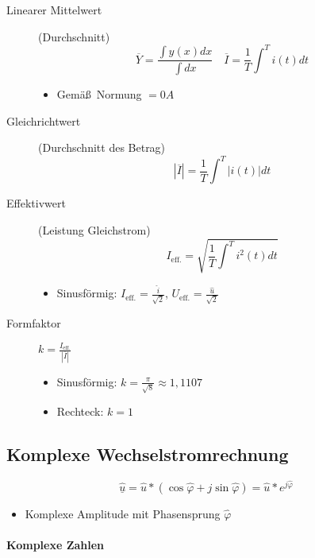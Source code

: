 \begin{description}
  \item[Linearer Mittelwert] (Durchschnitt)
    $$\overline{Y} = \frac{\int y(x)dx}{\int dx} \quad \overline{I} = \frac{1}{T} \int^T i(t) dt$$

    \begin{itemize}
      \item Gemä\ss~Normung $= 0A$
    \end{itemize}

  \item[Gleichrichtwert] (Durchschnitt des Betrag)
    $$|\overline{I}| = \frac{1}{T} \int^T |i(t)| dt$$

  \item[Effektivwert] (Leistung Gleichstrom)
    $$I_\text{eff.} = \sqrt{\frac{1}{T} \int^T i^2(t) dt} $$

    \begin{itemize}
      \item Sinusförmig: $I_\text{eff.} = \frac{\hat{i}}{\sqrt{2}}$, $U_\text{eff.} = \frac{\hat{u}}{\sqrt{2}}$
    \end{itemize}

  \item[Formfaktor] $k = \frac{I_\text{eff.}}{|\overline{I}|}$

    \begin{itemize}
      \item Sinusförmig: $k = \frac{\pi}{\sqrt{8}} \approx 1,1107$
      \item Rechteck: $k = 1$
    \end{itemize}
\end{description}

\subsection{Komplexe Wechselstromrechnung}

$$\underline{\hat{u}} = \hat{u} * (\cos \hat{\varphi} + j \sin \hat{\varphi}) = \hat{u} * e^{j\hat{\varphi}}$$

\begin{itemize}
  \item Komplexe Amplitude mit Phasensprung $\hat{\varphi}$
\end{itemize}

\paragraph{Komplexe Zahlen}

